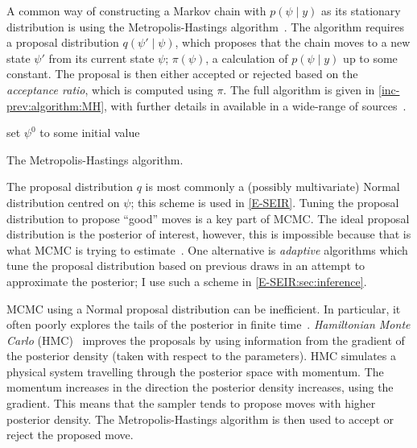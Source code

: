 \documentclass[thesis.tex]{subfiles}
\begin{document}
A common way of constructing a Markov chain with $p(\psi \mid y)$ as its stationary distribution is using the Metropolis-Hastings algorithm~\autocite{hastingsMCMC}.
The algorithm requires a proposal distribution $q(\psi' \mid \psi)$, which proposes that the chain moves to a new state $\psi'$ from its current state $\psi$; $\pi(\psi)$, a calculation of $p(\psi \mid y)$ up to some constant.
The proposal is then either accepted or rejected based on the \emph{acceptance ratio}, which is computed using $\pi$.
The full algorithm is given in \cref{inc-prev:algorithm:MH}, with further details in available in a wide-range of sources~\autocites[e.g.][]{brooksMCMCNotes}[chapter 11]{gelmanBDA}.
\begin{algorithm}
 set $\psi^0$ to some initial value\;
 \caption{The Metropolis-Hastings algorithm.}
 \label{inc-prev:algorithm:MH}
\end{algorithm}

The proposal distribution $q$ is most commonly a (possibly multivariate) Normal distribution centred on $\psi$; this scheme is used in \cref{E-SEIR}.
Tuning the proposal distribution to propose ``good'' moves is a key part of MCMC.
The ideal proposal distribution is the posterior of interest, however, this is impossible because that is what MCMC is trying to estimate~\autocite[296]{gelmanBDA}.
One alternative is \emph{adaptive} algorithms which tune the proposal distribution based on previous draws in an attempt to approximate the posterior; I use such a scheme in \cref{E-SEIR:sec:inference}.

MCMC using a Normal proposal distribution can be inefficient.
In particular, it often poorly explores the tails of the posterior in finite time~\autocite[e.g.][]{turitsynIrreversible}.
\emph{Hamiltonian Monte Carlo} (HMC)~\autocite{nealMCMC,nealImproved,duaneHybrid} improves the proposals by using information from the gradient of the posterior density (taken with respect to the parameters).
HMC simulates a physical system travelling through the posterior space with momentum.
The momentum increases in the direction the posterior density increases, using the gradient.
This means that the sampler tends to propose moves with higher posterior density.
The Metropolis-Hastings algorithm is then used to accept or reject the proposed move.
\end{document}
